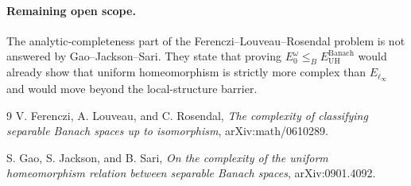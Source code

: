 \documentclass[11pt]{article}
\begin{document}
\paragraph{Remaining open scope.}
The analytic-completeness part of the Ferenczi--Louveau--Rosendal problem is not answered by Gao--Jackson--Sari.  They state that proving \(E_0^\omega\leq_B E_{\mathrm{UH}}^{\mathrm{Banach}}\) would already show that uniform homeomorphism is strictly more complex than \(E_{\ell_\infty}\) and would move beyond the local-structure barrier.

\begin{thebibliography}{9}
V. Ferenczi, A. Louveau, and C. Rosendal,
\emph{The complexity of classifying separable Banach spaces up to isomorphism},
arXiv:math/0610289.

S. Gao, S. Jackson, and B. Sari,
\emph{On the complexity of the uniform homeomorphism relation between separable Banach spaces},
arXiv:0901.4092.
\end{thebibliography}
\end{document}
